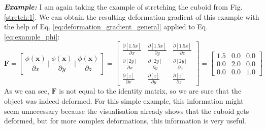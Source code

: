 \textbf{\textit{Example:}} I am again taking the example of stretching the cuboid from Fig. \ref{stretch:1}. We can obtain the resulting deformation gradient of this example with the help of Eq. \eqref{eq:deformation_gradient_general} applied to Eq. \eqref{eq:example_phi}:
\[
	\mathbf{F} = \left[ \,\frac{\phi(\mathbf{x})}{\partial x}\, \bigg| \,\frac{\phi(\mathbf{x})}{\partial y}\, \bigg| \,\frac{\phi(\mathbf{x})}{\partial z}\, \right] 
	= \begin{bmatrix} \frac{\partial [1.5x]}{\partial x} & \frac{\partial [1.5x]}{\partial y} & \frac{\partial [1.5x]}{\partial z} \\ \frac{\partial [2y]}{\partial x} & \frac{\partial [2y]}{\partial y} & \frac{\partial [2y]}{\partial z} \\ \frac{\partial [z]}{\partial x} & \frac{\partial [z]}{\partial y} & \frac{\partial [z]}{\partial z} \end{bmatrix} = \begin{bmatrix} 1.5 & 0.0 & 0.0 \\ 0.0 & 2.0 & 0.0 \\ 0.0 & 0.0 & 1.0 \end{bmatrix}
\]
As we can see, $\mathbf{F}$ is not equal to the identity matrix, so we are sure that the object was indeed deformed. For this simple example, this information might seem unnecessary because the visualisation already shows that the cuboid gets deformed, but for more complex deformations, this information is very useful.

